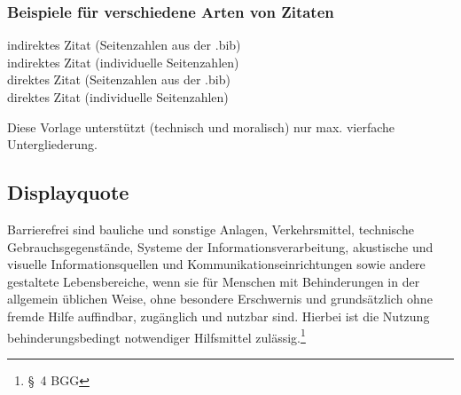 \newpage
\subsubsection{Beispiele für verschiedene Arten von Zitaten}%

indirektes Zitat (Seitenzahlen aus der .bib)\\%
indirektes Zitat (individuelle Seitenzahlen)\\%
direktes Zitat (Seitenzahlen aus der .bib)\\%
direktes Zitat (individuelle Seitenzahlen)

Diese Vorlage unterstützt (technisch und moralisch) nur max. vierfache Untergliederung.

\subsection{Displayquote}
\begin{displayquote}
    Barrierefrei sind bauliche und sonstige Anlagen, Verkehrsmittel, technische Gebrauchsgegenstände, Systeme der Informationsverarbeitung, akustische und visuelle Informationsquellen und Kommunikationseinrichtungen sowie andere gestaltete Lebensbereiche, wenn sie für Menschen mit Behinderungen in der allgemein üblichen Weise, ohne besondere Erschwernis und grundsätzlich ohne fremde Hilfe auffindbar, zugänglich und nutzbar sind. Hierbei ist die Nutzung behinderungsbedingt notwendiger Hilfsmittel zulässig.\footnote{§ 4 BGG}
\end{displayquote}


